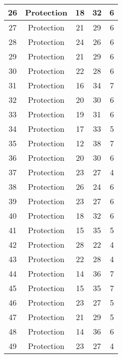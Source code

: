 \documentclass[results.tex]{subfiles}
\begin{document}
\begin{center}
\begin{tabular}{| c || c | c | c | c |}
    \hline
    26 & Protection & 18 & 32 & 6 \\ 
    \hline
    27 & Protection & 21 & 29 & 6 \\ 
    \hline
    28 & Protection & 24 & 26 & 6 \\ 
    \hline
    29 & Protection & 21 & 29 & 6 \\ 
    \hline
    30 & Protection & 22 & 28 & 6 \\ 
    \hline
    31 & Protection & 16 & 34 & 7 \\ 
    \hline
    32 & Protection & 20 & 30 & 6 \\ 
    \hline
    33 & Protection & 19 & 31 & 6 \\ 
    \hline
    34 & Protection & 17 & 33 & 5 \\ 
    \hline
    35 & Protection & 12 & 38 & 7 \\ 
    \hline
    36 & Protection & 20 & 30 & 6 \\ 
    \hline
    37 & Protection & 23 & 27 & 4 \\ 
    \hline
    38 & Protection & 26 & 24 & 6 \\ 
    \hline
    39 & Protection & 23 & 27 & 6 \\ 
    \hline
    40 & Protection & 18 & 32 & 6 \\ 
    \hline
    41 & Protection & 15 & 35 & 5 \\ 
    \hline
    42 & Protection & 28 & 22 & 4 \\ 
    \hline
    43 & Protection & 22 & 28 & 4 \\ 
    \hline
    44 & Protection & 14 & 36 & 7 \\ 
    \hline
    45 & Protection & 15 & 35 & 7 \\ 
    \hline
    46 & Protection & 23 & 27 & 5 \\ 
    \hline
    47 & Protection & 21 & 29 & 5 \\ 
    \hline
    48 & Protection & 14 & 36 & 6 \\ 
    \hline
    49 & Protection & 23 & 27 & 4 \\ 
    \hline   \end{tabular}
\end{center}
\end{document}

